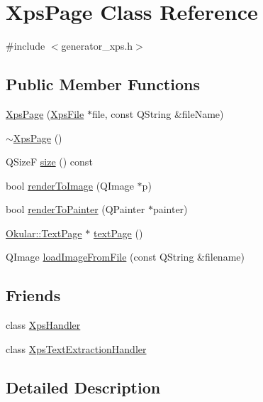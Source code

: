 \hypertarget{classXpsPage}{\section{Xps\+Page Class Reference}
\label{classXpsPage}
}


{\ttfamily \#include $<$generator\+\_\+xps.\+h$>$}

\subsection*{Public Member Functions}
\begin{DoxyCompactItemize}
\item 
\hyperlink{classXpsPage_a96d35a768de0582d565bf7b4de3b89ba}{Xps\+Page} (\hyperlink{classXpsFile}{Xps\+File} $\ast$file, const Q\+String \&file\+Name)
\item 
\hyperlink{classXpsPage_a1fca8c3ea39fe873a974c84a3e013450}{$\sim$\+Xps\+Page} ()
\item 
Q\+Size\+F \hyperlink{classXpsPage_ac5e7fcc989660f848e7c30d195c53585}{size} () const 
\item 
bool \hyperlink{classXpsPage_a2d3755b9f7869da5fd52cbb9f4799123}{render\+To\+Image} (Q\+Image $\ast$p)
\item 
bool \hyperlink{classXpsPage_a51efc63b391591ee524464666de2ba3e}{render\+To\+Painter} (Q\+Painter $\ast$painter)
\item 
\hyperlink{classOkular_1_1TextPage}{Okular\+::\+Text\+Page} $\ast$ \hyperlink{classXpsPage_a6aee6a94650e230c3f84cf75ae4bc55f}{text\+Page} ()
\item 
Q\+Image \hyperlink{classXpsPage_ab1afed165c88b931d2877fdda48ba6b2}{load\+Image\+From\+File} (const Q\+String \&filename)
\end{DoxyCompactItemize}
\subsection*{Friends}
\begin{DoxyCompactItemize}
\item 
class \hyperlink{classXpsPage_ad0fe4fbffbab0a0e41d5ac136f260079}{Xps\+Handler}
\item 
class \hyperlink{classXpsPage_a1691bf1641e80a5ce07ba96e3c7702e1}{Xps\+Text\+Extraction\+Handler}
\end{DoxyCompactItemize}


\subsection{Detailed Description}



